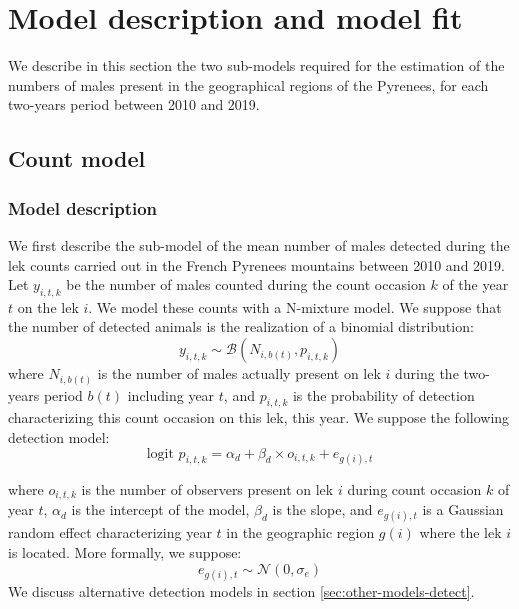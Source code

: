 \documentclass[a4paper]{article}
\newenvironment{Default Paragraph Font}{}{}
\begin{document}
\section{Model description and model fit}
\label{sec:notat-model-descr}

We describe in this section the two sub-models required for the
estimation of the numbers of males present in the geographical regions
of the Pyrenees, for each two-years period between 2010 and 2019.

\subsection{Count model}
\label{sec:model-description}

\subsubsection{ Model description}
\label{sec:model-description-1}

We first describe the sub-model of the mean number of males detected
during the lek counts carried out in the French Pyrenees mountains
between 2010 and 2019.\\

Let $y_{i,t,k}$ be the number of males counted during the count
occasion $k$ of the year $t$ on the lek $i$. We model these counts
with a N-mixture model. We suppose that the number of detected animals
is the realization of a binomial distribution:
\begin{equation}
  \label{eq:eqy}
y_{i,t,k} \sim \mathcal{B}(N_{i,b(t)}, p_{i,t,k})
\end{equation}
where $N_{i,b(t)}$ is the number of males actually present on lek $i$
during the two-years period $b(t)$ including year $t$, and $p_{i,t,k}$
is the probability of detection characterizing this count occasion on
this lek, this year. We suppose the following detection model:
\begin{equation}
  \label{eq:detect}
\mbox{logit } p_{i,t,k} = \alpha_d + \beta_d \times o_{i,t,k} + e_{g(i),t}
\end{equation}

where $o_{i,t,k}$ is the number of observers present on lek $i$ during
count occasion $k$ of year $t$, $\alpha_d$ is the intercept of the
model, $\beta_d$ is the slope, and $e_{g(i),t}$ is a Gaussian random
effect characterizing year $t$ in the geographic region $g(i)$ where
the lek $i$ is located. More formally, we suppose:
$$
e_{g(i),t} \sim \mathcal{N}(0, \sigma_e)
$$
We discuss alternative detection models in section
\ref{sec:other-models-detect}.\\
\end{document}
